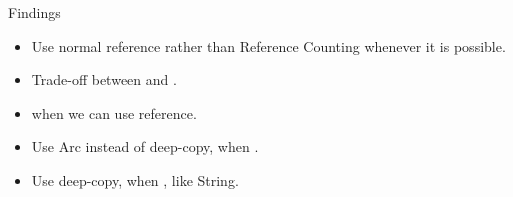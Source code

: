 \documentclass[9pt]{beamer}
\begin{document}

\begin{frame}[fragile]{Findings}
    \begin{itemize}
        \item Use normal reference rather than Reference Counting whenever it is possible.
        \item Trade-off between  and .
        \item {} when we can use reference.
        \item Use Arc instead of deep-copy, when .
        \item Use deep-copy, when , like String.
    \end{itemize}
\end{frame}




\end{document}
